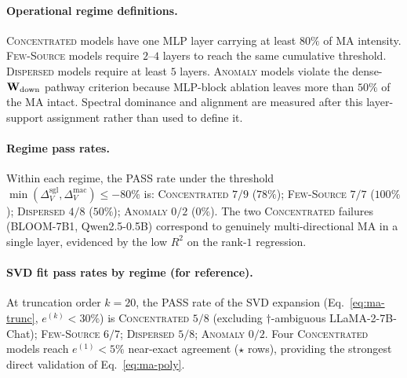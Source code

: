 \paragraph{Operational regime definitions.}
\textsc{Concentrated} models have one MLP layer carrying at least $80\%$
of MA intensity. \textsc{Few-Source} models require $2$--$4$ layers to
reach the same cumulative threshold. \textsc{Dispersed} models require at
least $5$ layers. \textsc{Anomaly} models violate the dense-$\mathbf{W}_{\text{down}}$
pathway criterion because MLP-block ablation leaves more than $50\%$ of
the MA intact. Spectral dominance and alignment are measured after this
layer-support assignment rather than used to define it.

\paragraph{Regime pass rates.}
Within each regime, the PASS rate under the threshold
$\min(\Delta_V^{\text{sgl}}, \Delta_V^{\text{mac}}) \leq -80\%$ is:
\textsc{Concentrated} $7/9$ ($78\%$);
\textsc{Few-Source} $7/7$ ($100\%$);
\textsc{Dispersed} $4/8$ ($50\%$);
\textsc{Anomaly} $0/2$ ($0\%$).
The two \textsc{Concentrated} failures (BLOOM-7B1, Qwen2.5-0.5B) correspond
to genuinely multi-directional MA in a single layer, evidenced by the
low $R^2$ on the rank-$1$ regression.

\paragraph{SVD fit pass rates by regime (for reference).}
At truncation order $k{=}20$, the PASS rate of the SVD expansion
(Eq.~\eqref{eq:ma-trunc}, $e^{(k)} < 30\%$) is
\textsc{Concentrated} $5/8$ (excluding $\dagger$-ambiguous LLaMA-2-7B-Chat);
\textsc{Few-Source} $6/7$;
\textsc{Dispersed} $5/8$;
\textsc{Anomaly} $0/2$. Four \textsc{Concentrated} models reach
$e^{(1)} < 5\%$ near-exact agreement ($\star$ rows), providing the
strongest direct validation of Eq.~\eqref{eq:ma-poly}.

